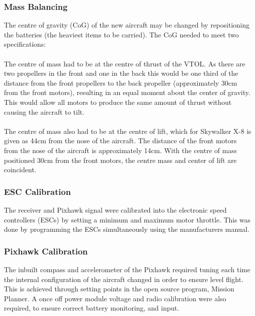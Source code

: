 \subsubsection*{Mass Balancing}
The centre of gravity (CoG) of the new aircraft may be changed by repositioning the batteries (the heaviest items to be carried). The CoG needed to meet two specifications:
	\\\\The centre of mass had to be at the centre of thrust of the VTOL. As there are two propellers in the front and one in the back this would be one third of the distance from the front propellers to the back propeller (approximately 30cm from the front motors), resulting in an equal moment about the center of gravity. This would allow all motors to produce the same amount of thrust without causing the aircraft to tilt.
	\\\\The centre of mass also had to be at the centre of lift, which for Skywalker X-8 is given as 44cm from the nose of the aircraft. The distance of the front motors from the nose of the aircraft is approximately 14cm. With the centre of mass positioned 30cm from the front motors, the centre mass and center of lift are coincident.
\subsubsection*{ESC Calibration}
The receiver and Pixhawk signal were calibrated into the electronic speed controllers (ESCs) by setting a minimum and maximum motor throttle. This was done by programming the ESCs simultaneously using the manufacturers manual.

\subsubsection*{Pixhawk Calibration}
The inbuilt compass and accelerometer of the Pixhawk required tuning each time the internal configuration of the aircraft changed in order to ensure level flight. This is achieved through setting points in the open source program, Mission Planner. A once off power module voltage and radio calibration were also required, to ensure correct battery monitoring, and input. 

